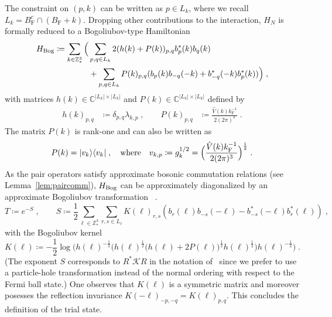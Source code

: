 \documentclass[12pt,a4paper]{article}
\numberwithin{equation}{section}
\newcommand{\cK}{\mathcal{K}}
\newcommand{\CCC}{\mathbb{C}}
\newcommand{\ZZZ}{\mathbb{Z}}
\newcommand{\1}{\mathbb{I}}
\newcommand{\Bog}{\textnormal{Bog}}
\newcommand{\F}{\mathrm{F}}
\newcommand{\half}{\frac{1}{2}}
\theoremstyle{plain}
\theoremstyle{definition}
\theoremstyle{remark}
\theoremstyle{plain}
\theoremstyle{definition}
\theoremstyle{remark}
\begin{document}
The constraint on $ (p,k) $ can be written as $ p \in L_k $, where we recall $ L_k = B_{\F}^c \cap (B_{\F} + k) $.
Dropping other contributions to the interaction, $ H_N $ is formally reduced to a Bogoliubov-type Hamiltonian~\cite[(1.34)]{CHN23}
\begin{equation} \label{eq:HBog}
\begin{split}
	H_{\Bog}
	\coloneq \sum_{k \in \ZZZ^3_*} \Big( & \sum_{p,q \in L_k} 2 (h(k) + P(k))_{p,q} b^*_p(k) b_q(k) \\
	& 		+ \sum_{p,q \in L_k} P(k)_{p,q} (b_p(k) b_{-q}(-k) + b^*_{-q}(-k) b^*_p(k)) \Big) \;,
\end{split}
\end{equation}
with matrices $ h(k) \in \CCC^{|L_k| \times |L_k|}$ and $P(k) \in \CCC^{|L_k| \times |L_k|} $ defined by
\begin{equation} \label{eq:HkPk}
\begin{aligned}
	h(k)_{p,q} &\coloneq \delta_{p,q} \lambda_{k,p} \;, \qquad
	P(k)_{p,q} &\coloneq \frac{\hat{V}(k) k_{\F}^{-1}}{2 (2 \pi)^3} \;.
\end{aligned}
\end{equation}
The matrix $ P(k) $ is rank-one and can also be written as
\begin{equation}P(k) = \lvert v_k \rangle \langle v_k \rvert \;, \quad \textnormal{where} \quad v_{k,p} \coloneq g_k^{1/2} = \Big( \frac{\hat{V}(k) k_{\F}^{-1}}{2 (2 \pi)^3} \Big)^\half \;.
\end{equation}
 As the pair operators satisfy approximate bosonic commutation relations (see Lemma~\ref{lem:paircomm}), $ H_{\Bog} $ can be approximately diagonalized by an approximate Bogoliubov transformation ~\cite[Thm.~1.4]{CHN23}.
\begin{equation} \label{eq:T}
	T \coloneq e^{-S} \;, \qquad
	S \coloneq \frac{1}{2}\sum_{\ell\in \mathbb{Z}^3_*}\sum_{r,s\in L_\ell}K(\ell)_{r,s}\left(b_r(\ell)b_{-s}(-\ell)-b^*_{-s}(-\ell)b^*_{r}(\ell)\right) \;,
\end{equation}
with the Bogoliubov kernel
\begin{equation} \label{eq:K}
	K(\ell) \coloneq - \half \log \Big( h(\ell)^{-\half}
		\big( h(\ell)^{\half} \big( h(\ell) + 2 P(\ell) \big)^{\half} h(\ell)^{\half}\big)
		h(\ell)^{-\half} \Big) \;.
\end{equation}
(The exponent $ S $ corresponds to $ R^* \cK R $ in the notation of~\cite{CHN23} since we prefer to use a particle-hole transformation instead of the normal ordering with respect to the Fermi ball state.)
One observes that $K(\ell)$ is a symmetric matrix and moreover posesses the reflection invariance $ K(-\ell)_{-p,-q} = K(\ell)_{p,q} $. This concludes the definition of the trial state.
\end{document}
